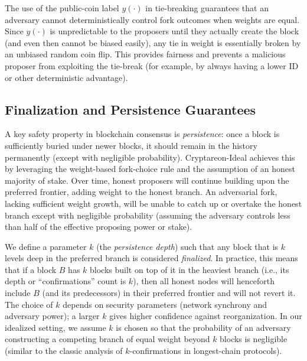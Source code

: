 The use of the public-coin label $y(\cdot)$ in tie-breaking guarantees that an adversary cannot deterministically control fork outcomes when weights are equal. Since $y(\cdot)$ is unpredictable to the proposers until they actually create the block (and even then cannot be biased easily), any tie in weight is essentially broken by an unbiased random coin flip. This provides fairness and prevents a malicious proposer from exploiting the tie-break (for example, by always having a lower ID or other deterministic advantage).

\subsection{Finalization and Persistence Guarantees}

A key safety property in blockchain consensus is \emph{persistence}: once a block is sufficiently buried under newer blocks, it should remain in the history permanently (except with negligible probability). Cryptareon-Ideal achieves this by leveraging the weight-based fork-choice rule and the assumption of an honest majority of stake. Over time, honest proposers will continue building upon the preferred frontier, adding weight to the honest branch. An adversarial fork, lacking sufficient weight growth, will be unable to catch up or overtake the honest branch except with negligible probability (assuming the adversary controls less than half of the effective proposing power or stake).

We define a parameter $k$ (the \emph{persistence depth}) such that any block that is $k$ levels deep in the preferred branch is considered \emph{finalized}. In practice, this means that if a block $B$ has $k$ blocks built on top of it in the heaviest branch (i.e., its depth or ``confirmations'' count is $k$), then all honest nodes will henceforth include $B$ (and its predecessors) in their preferred frontier and will not revert it. The choice of $k$ depends on security parameters (network synchrony and adversary power); a larger $k$ gives higher confidence against reorganization. In our idealized setting, we assume $k$ is chosen so that the probability of an adversary constructing a competing branch of equal weight beyond $k$ blocks is negligible (similar to the classic analysis of $k$-confirmations in longest-chain protocols).

